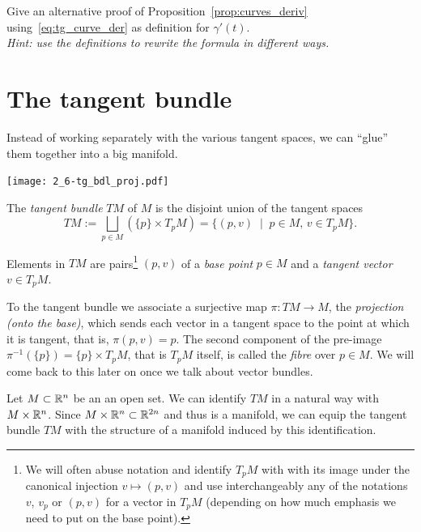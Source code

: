 \begin{exercise}
	Give an alternative proof of Proposition~\ref{prop:curves_deriv} using~\eqref{eq:tg_curve_der} as definition for $\gamma'(t)$.\\
	\textit{\small Hint: use the definitions to rewrite the formula in different ways.}
\end{exercise}

\section{The tangent bundle}\label{sec:tangentbundle}

Instead of working separately with the various tangent spaces, we can ``glue'' them together into a big manifold.

\begin{marginfigure}
	\texttt{[image: 2\_6-tg\_bdl\_proj.pdf]}
\end{marginfigure}
\begin{definition}
	The \emph{tangent bundle} $TM$ of $M$ is the disjoint union of the tangent spaces
	\begin{equation}
		TM := \bigsqcup_{p\in M}\left(\{p\}\times T_pM\right)
		= \{(p,v) \;\mid\; p\in M,\, v\in T_pM\}.
	\end{equation}
\end{definition}

Elements in $TM$ are pairs\footnote{We will often abuse notation and identify $T_pM$ with with its image under the canonical injection $v\mapsto(p,v)$ and use interchangeably any of the notations $v$, $v_p$ or $(p,v)$ for a vector in $T_pM$ (depending on how much emphasis we need to put on the base point).} $(p,v)$ of a \emph{base point} $p\in M$ and a \emph{tangent vector} $v\in T_pM$.

To the tangent bundle we associate a surjective map $\pi:TM \to M$, the \emph{projection (onto the base)}, which sends each vector in a tangent space to the point at which it is tangent, that is, $\pi(p,v) = p$.
The second component of the pre-image $\pi^{-1}(\{p\}) = \{p\}\times T_pM$, that is $T_pM$ itself, is called the \emph{fibre} over $p\in M$.
We will come back to this later on once we talk about vector bundles.

\begin{example}
	Let $M\subset \mathbb{R}^n$ be an an open set.
	We can identify $TM$ in a natural way with $M\times\mathbb{R}^n$.
	Since $M\times\mathbb{R}^n \subset \mathbb{R}^{2n}$ and thus is a manifold, we can equip the tangent bundle $TM$ with the structure of a manifold induced by this identification.
\end{example}

